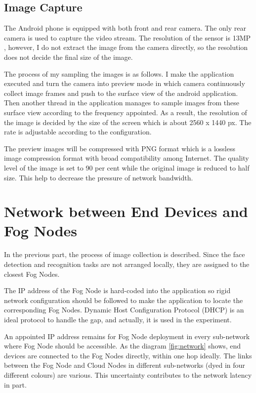 \subsection{Image Capture}
The Android phone is equipped with both front and rear camera. The only rear camera is used to capture the video stream. The resolution of the sensor is 13MP \cite{wiki:megapixel}, however, I do not extract the image from the camera directly, so the resolution does not decide the final size of the image.

The process of my sampling the images is as follows. I make the application executed and turn the camera into preview mode in which camera continuously collect image frames and push to the surface view of the android application. Then another thread in the application manages to sample images from these surface view according to the frequency appointed. As a result, the resolution of the image is decided by the size of the screen which is about 2560 x 1440 px. The rate is adjustable according to the configuration.

The preview images will be compressed with PNG format  \cite{roelofs1999png} which is a lossless image compression format with broad compatibility among Internet. The quality level of the image is set to 90 per cent while the original image is reduced to half size. This help to decrease the pressure of network bandwidth.

\section{Network between End Devices and Fog Nodes}
In the previous part, the process of image collection is described. Since the face detection and recognition tasks are not arranged locally, they are assigned to the closest Fog Nodes.

The IP address of the Fog Node is hard-coded into the application so rigid network configuration should be followed to make the application to locate the corresponding Fog Nodes. Dynamic Host Configuration Protocol (DHCP) \cite{droms2002dhcp} is an ideal protocol to handle the gap, and actually, it is used in the experiment.

An appointed IP address remains for Fog Node deployment in every sub-network where Fog Node should be accessible. As the diagram \ref{fig:network} shows, end devices are connected to the Fog Nodes directly, within one hop ideally. The links between the Fog Node and Cloud Nodes in different sub-networks (dyed in four different colours) are various. This uncertainty contributes to the network latency in part.

